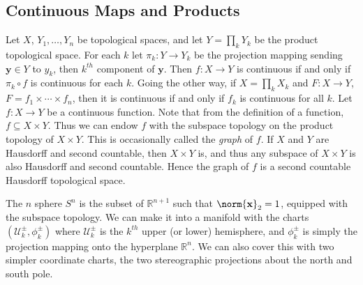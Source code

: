     \subsection{Continuous Maps and Products}
        Let $X$, $Y_{1},\dots,Y_{n}$ be topological spaces, and let
        $Y=\prod_{k}Y_{k}$ be the product topological space. For each
        $k$ let $\pi_{k}:Y\rightarrow{Y}_{k}$ be the projection mapping
        sending $\mathbf{y}\in{Y}$ to $y_{k}$, then $k^{th}$ component
        of $\mathbf{y}$. Then $f:X\rightarrow{Y}$ is continuous if and
        only if $\pi_{k}\circ{f}$ is continuous for each $k$. Going the
        other way, if $X=\prod_{k}X_{k}$ and $F:X\rightarrow{Y}$,
        $F=f_{1}\times\cdots\times{f}_{n}$, then it is continuous if and
        only if $f_{k}$ is continuous for all $k$. Let
        $f:X\rightarrow{Y}$ be a continuous function. Note that from the
        definition of a function, $f\subseteq{X}\times{Y}$. Thus we can
        endow $f$ with the subspace topology on the product topology of
        $X\times{Y}$. This is occasionally called the \textit{graph} of
        $f$. If $X$ and $Y$ are Hausdorff and second countable, then
        $X\times{Y}$ is, and thus any subspace of $X\times{Y}$ is
        also Hausdorff and second countable. Hence the graph of $f$ is
        a second countable Hausdorff topological space.
        \begin{example}
            The $n$ sphere $S^{n}$ is the subset of $\mathbb{R}^{n+1}$
            such that $\norm{\mathbf{x}}_{2}=1$, equipped with the
            subspace topology. We can make it into a manifold with the
            charts $(\mathcal{U}_{k}^{\pm},\phi_{k}^{\pm})$ where
            $\mathcal{U}_{k}^{\pm}$ is the $k^{th}$ upper (or lower)
            hemisphere, and $\phi_{k}^{\pm}$ is simply the projection
            mapping onto the hyperplane $\mathbb{R}^{n}$. We can also
            cover this with two simpler coordinate charts, the
            two stereographic projections about the north and south
            pole.
        \end{example}
